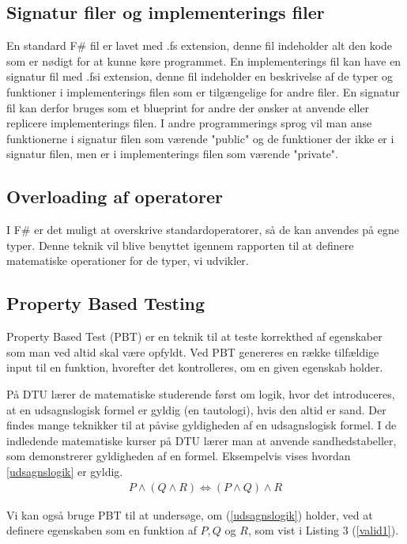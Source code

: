 \subsection{Signatur filer og implementerings filer}
En standard F\# fil er lavet med .fs extension, denne fil indeholder alt den kode som er nødigt for at kunne køre programmet. En implementerings fil kan have en signatur fil med .fsi extension, denne fil indeholder en beskrivelse af de typer og funktioner i implementerings filen som er tilgængelige for andre filer. En signatur fil kan derfor bruges som et blueprint for andre der ønsker at anvende eller replicere implementerings filen. I andre programmerings sprog vil man anse funktionerne i signatur filen som værende "public" og de funktioner der ikke er i signatur filen, men er i implementerings filen som værende "private". 

\subsection{Overloading af operatorer}
I F\# er det muligt at overskrive standardoperatorer, så de kan anvendes på egne typer. Denne teknik vil blive benyttet igennem rapporten til at definere matematiske operationer for de typer, vi udvikler.

\subsection{Property Based Testing}
Property Based Test (PBT) er en teknik til at teste korrekthed af egenskaber som man ved altid skal være opfyldt. Ved PBT genereres en række tilfældige input til en funktion, hvorefter det kontrolleres, om en given egenskab holder. 

På DTU lærer de matematiske studerende først om logik, hvor det introduceres, at en udsagnslogisk formel er gyldig (en tautologi), hvis den altid er sand. Der findes mange teknikker til at påvise gyldigheden af en udsagnslogisk formel. I de indledende matematiske kurser på DTU lærer man at anvende sandhedstabeller, som demonstrerer gyldigheden af en formel. Eksempelvis vises hvordan \ref{udsagnslogik} er gyldig.
\begin{gather}
    P \land (Q \land R) \iff (P \land Q) \land R
    \label{udsagnslogik}
\end{gather}

Vi kan også bruge PBT til at undersøge, om (\ref{udsagnslogik}) holder, ved at definere egenskaben som en funktion af $P, Q$ og $R$, som vist i Listing 3 (\ref{valid1}).


